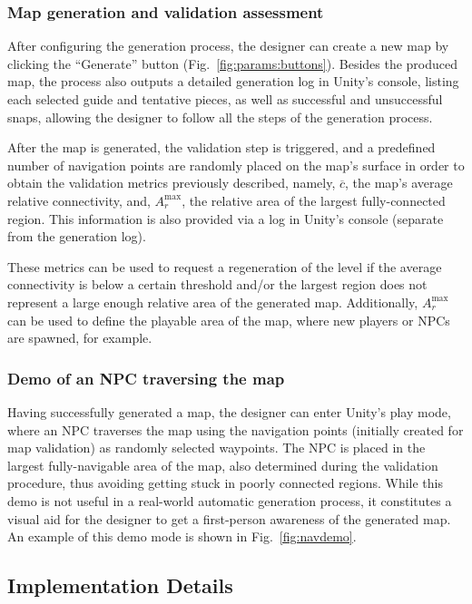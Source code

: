 \documentclass[journal]{IEEEtran}
\begin{document}
\subsubsection{Map generation and validation assessment}
\label{sec:impl:workflow:genvalid}

After configuring the generation process, the designer can create a new map by clicking the
``Generate'' button (Fig.~\ref{fig:params:buttons}). Besides the produced map, the process
also outputs a detailed generation log in Unity's console, listing each selected guide and
tentative pieces, as well as successful and unsuccessful snaps, allowing the designer to
follow all the steps of the generation process.

After the map is generated, the validation step is triggered, and a predefined number of
navigation points are randomly placed on the map's surface in order to obtain the validation
metrics previously described, namely, $\overline{c}$, the map's average relative connectivity,
and, $A_r^\text{max}$, the relative area of the largest fully-connected region. This information
is also provided via a log in Unity's console (separate from the generation log).

These metrics can be used to request a regeneration of the level if the average connectivity
is below a certain threshold and/or the largest region does not represent a large enough
relative area of the generated map. Additionally, $A_r^\text{max}$ can be used to define
the playable area of the map, where new players or NPCs are spawned, for example.

\subsubsection{Demo of an NPC traversing the map}
\label{sec:impl:workflow:demo}

Having successfully generated a map, the designer can enter Unity's play mode, where an NPC
traverses the map using the navigation points (initially created for map validation) as
randomly selected waypoints. The NPC is placed in the largest fully-navigable area of the map,
also determined during the validation procedure, thus avoiding getting stuck in poorly
connected regions. While this demo is not useful in a real-world automatic generation process,
it constitutes a visual aid for the designer to get a first-person awareness of the generated
map. An example of this demo mode is shown in Fig.~\ref{fig:navdemo}.

\subsection{Implementation Details}
\label{sec:impl:details}
\end{document}
